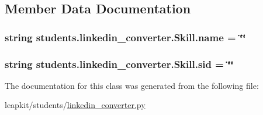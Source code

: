 \subsection{Member Data Documentation}
\hypertarget{classstudents_1_1linkedin__converter_1_1_skill_a2d5ed72765fe5fb834aa89ece121e53e}{
\subsubsection[{name}]{\setlength{\rightskip}{0pt plus 5cm}string students.\-linkedin\-\_\-converter.\-Skill.\-name = \char`\"{}\char`\"{}\hspace{0.3cm}{\ttfamily [static]}}}\label{classstudents_1_1linkedin__converter_1_1_skill_a2d5ed72765fe5fb834aa89ece121e53e}
\hypertarget{classstudents_1_1linkedin__converter_1_1_skill_a833fda242e2aa99c0b3d146fd02edfda}{
\subsubsection[{sid}]{\setlength{\rightskip}{0pt plus 5cm}string students.\-linkedin\-\_\-converter.\-Skill.\-sid = \char`\"{}\char`\"{}\hspace{0.3cm}{\ttfamily [static]}}}\label{classstudents_1_1linkedin__converter_1_1_skill_a833fda242e2aa99c0b3d146fd02edfda}


The documentation for this class was generated from the following file\-:\begin{DoxyCompactItemize}
\item 
leapkit/students/\hyperlink{linkedin__converter_8py}{linkedin\-\_\-converter.\-py}\end{DoxyCompactItemize}
